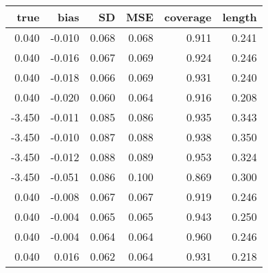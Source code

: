 \begin{table}[ht]
\centering
\begin{tabular}{rrrrrr}
  \hline
true & bias & SD & MSE & coverage & length \\ 
  \hline
0.040 & -0.010 & 0.068 & 0.068 & 0.911 & 0.241 \\ 
  0.040 & -0.016 & 0.067 & 0.069 & 0.924 & 0.246 \\ 
  0.040 & -0.018 & 0.066 & 0.069 & 0.931 & 0.240 \\ 
  0.040 & -0.020 & 0.060 & 0.064 & 0.916 & 0.208 \\ 
  -3.450 & -0.011 & 0.085 & 0.086 & 0.935 & 0.343 \\ 
  -3.450 & -0.010 & 0.087 & 0.088 & 0.938 & 0.350 \\ 
  -3.450 & -0.012 & 0.088 & 0.089 & 0.953 & 0.324 \\ 
  -3.450 & -0.051 & 0.086 & 0.100 & 0.869 & 0.300 \\ 
  0.040 & -0.008 & 0.067 & 0.067 & 0.919 & 0.246 \\ 
  0.040 & -0.004 & 0.065 & 0.065 & 0.943 & 0.250 \\ 
  0.040 & -0.004 & 0.064 & 0.064 & 0.960 & 0.246 \\ 
  0.040 & 0.016 & 0.062 & 0.064 & 0.931 & 0.218 \\ 
   \hline
\end{tabular}
\end{table}
